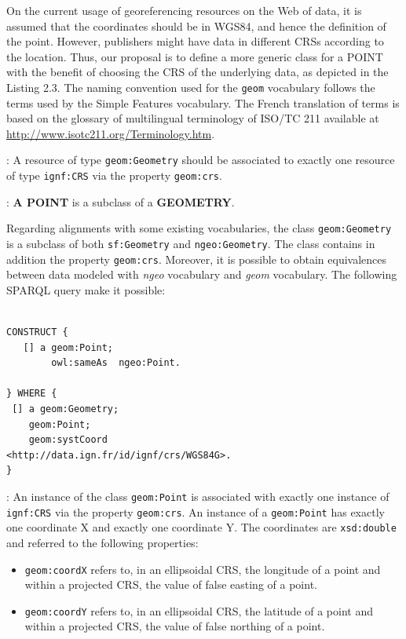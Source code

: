 On the current usage of georeferencing resources on the Web of data, it is assumed that the coordinates should be in WGS84, and hence the definition of the point. However, publishers might have data in different CRSs according to the location. Thus, our proposal is to define a more generic class for a POINT  with the benefit of choosing the CRS of the underlying data, as depicted in the Listing 2.3. 
The naming convention used for the \texttt{geom} vocabulary follows the terms used by the Simple Features vocabulary. The French translation of terms is based on the glossary of multilingual terminology of ISO/TC 211 available at \url{http://www.isotc211.org/Terminology.htm}.

\begin{deflda}:
A resource of type \texttt{geom:Geometry} should be associated to exactly one resource of type \texttt{ignf:CRS} via the property \texttt{geom:crs}.
\end{deflda}

\begin{deflda}:
\textbf{A POINT} is a subclass of a \textbf{GEOMETRY}.
\end{deflda}

Regarding alignments with some existing vocabularies, the class \texttt{geom:Geometry} is a subclass of both \texttt{sf:Geometry} and \texttt{ngeo:Geometry}. The class contains in addition the property \texttt{geom:crs}. Moreover, it is possible to obtain equivalences between data modeled with \emph{ngeo} vocabulary and \emph{geom} vocabulary. The following SPARQL query make it possible:

\begin{lstlisting}

CONSTRUCT {
   [] a geom:Point;
    	owl:sameAs  ngeo:Point.
 
} WHERE {
 [] a geom:Geometry;
	geom:Point;
	geom:systCoord
<http://data.ign.fr/id/ignf/crs/WGS84G>.
}

\end{lstlisting}


\begin{deflda}:
An instance of the class \texttt{geom:Point} is associated with exactly one instance of \texttt{ignf:CRS} via the property \texttt{geom:crs}. An instance of a \texttt{geom:Point} has exactly one coordinate X and exactly one coordinate Y. The coordinates are \texttt{xsd:double} and referred to the following properties:
\begin{itemize}
 \item \texttt{geom:coordX} refers to, in an ellipsoidal CRS, the longitude of a point and within a projected CRS, the value of false easting of a point.
 \item \texttt{geom:coordY} refers to, in an ellipsoidal CRS, the latitude of a point and within a projected CRS, the value of false northing of a point.
\end{itemize}
\end{deflda}


